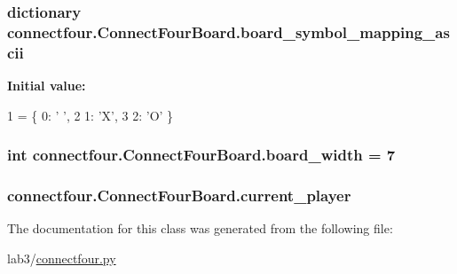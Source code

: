 \subsubsection[{board\+\_\+symbol\+\_\+mapping\+\_\+ascii}]{\setlength{\rightskip}{0pt plus 5cm}dictionary connectfour.\+Connect\+Four\+Board.\+board\+\_\+symbol\+\_\+mapping\+\_\+ascii\hspace{0.3cm}{\ttfamily [static]}}\label{classconnectfour_1_1_connect_four_board_a7d5a560c3dde1e17eae92e13ce03f32a}
{\bfseries Initial value\+:}
\begin{DoxyCode}
1 = \{ 0: \textcolor{stringliteral}{' '},
2                                    1: \textcolor{stringliteral}{'X'},
3                                    2: \textcolor{stringliteral}{'O'} \}
\end{DoxyCode}
\hypertarget{classconnectfour_1_1_connect_four_board_a57326ec6b2c23f9dafd27d84f6ce0b27}{}
\subsubsection[{board\+\_\+width}]{\setlength{\rightskip}{0pt plus 5cm}int connectfour.\+Connect\+Four\+Board.\+board\+\_\+width = 7\hspace{0.3cm}{\ttfamily [static]}}\label{classconnectfour_1_1_connect_four_board_a57326ec6b2c23f9dafd27d84f6ce0b27}
\hypertarget{classconnectfour_1_1_connect_four_board_a9fe155eb44056df0fe1ca6c0cbcd69d3}{}
\subsubsection[{current\+\_\+player}]{\setlength{\rightskip}{0pt plus 5cm}connectfour.\+Connect\+Four\+Board.\+current\+\_\+player}\label{classconnectfour_1_1_connect_four_board_a9fe155eb44056df0fe1ca6c0cbcd69d3}


The documentation for this class was generated from the following file\+:\begin{DoxyCompactItemize}
\item 
lab3/\hyperlink{connectfour_8py}{connectfour.\+py}\end{DoxyCompactItemize}
